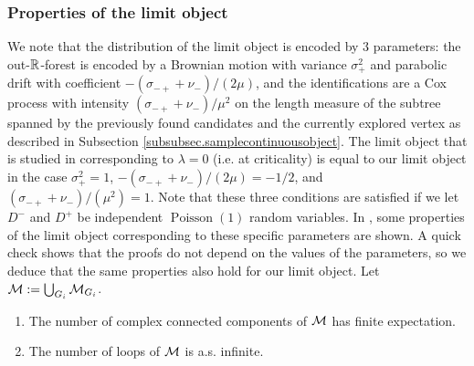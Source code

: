 \subsubsection{Properties of the limit object}
We note that the distribution of the limit object is encoded by $3$ parameters: the out-${\mathbb R}$-forest is encoded by a Brownian motion with variance $\sigma_+^2$ and parabolic drift with coefficient $-(\sigma_{-+}+\nu_-)/(2\mu)$, and the identifications are a Cox process with intensity $(\sigma_{-+}+\nu_-)/\mu^2$ on the length measure of the subtree spanned by the previously found candidates and the currently explored vertex as described in Subsection \ref{subsubsec.samplecontinuousobject}. The limit object that is studied in \cite{goldschmidtScalingLimitCritical2021} corresponding to $\lambda=0$ (i.e. at criticality) is equal to our limit object in the case $\sigma_+^2=1$, $-(\sigma_{-+}+\nu_-)/(2\mu)=-1/2$, and $(\sigma_{-+}+\nu_-)/(\mu^2)=1$. Note that these three conditions are satisfied if we let $D^-$ and $D^+$ be independent $\operatorname{Poisson}(1)$ random variables. In \cite{goldschmidtScalingLimitCritical2021}, some properties of the limit object corresponding to these specific parameters are shown. A quick check shows that the proofs do not depend on the values of the parameters, so we deduce that the same properties also hold for our limit object. Let ${\mathcal M}:=\bigcup_{G_i}{\mathcal M}_{G_i}$.

\begin{proposition}
\begin{enumerate}
    \item The number of complex connected components of ${\mathcal M}$ has finite expectation.
    \item The number of loops of ${\mathcal M}$ is a.s. infinite.
\end{enumerate}
\end{proposition}

